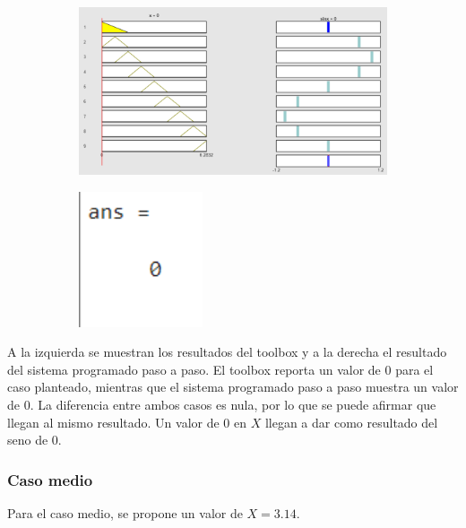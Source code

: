 \documentclass[11pt, letterpaper]{article}
\begin{document}
\begin{figure}[h]
	\centering
	\begin{subfigure}{0.45\textwidth} %
		\centering
		\includegraphics[width=1.4\textwidth]{IMG/RP11.png}
		\label{fig:G3}
	\end{subfigure}
	\hfill
	\begin{subfigure}{0.42\textwidth} %
		\centering
		\includegraphics[width=0.4\textwidth]{IMG/M11.png}
		\label{fig:G4}
	\end{subfigure}
	\label{fig:comparacion2}
\end{figure}

A la izquierda se muestran los resultados del toolbox y a la derecha el resultado del sistema programado paso a paso. El toolbox reporta un valor de 0 para el caso planteado, mientras que el sistema programado paso a paso muestra un valor de 0. La diferencia entre ambos casos es nula, por lo que se puede afirmar que llegan al mismo resultado. Un valor de 0 en $X$ llegan a dar como resultado del seno de 0.

\newpage

\subsubsection{Caso medio}
Para el caso medio, se propone un valor de $X = 3.14$.
\end{document}
